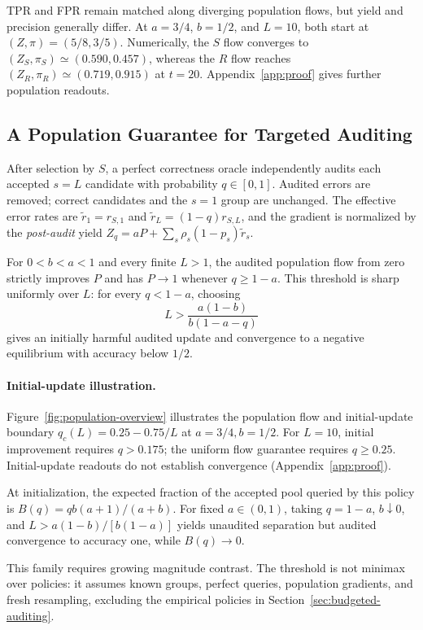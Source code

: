 \begin{remark}
TPR and FPR remain matched along diverging population flows, but yield and
precision generally differ. At $a=3/4$, $b=1/2$, and $L=10$, both start
at $(Z,\pi)=(5/8,3/5)$. Numerically, the $S$ flow converges to
$(Z_S,\pi_S)\simeq(0.590,0.457)$, whereas the $R$ flow reaches
$(Z_R,\pi_R)\simeq(0.719,0.915)$ at $t=20$.
Appendix~\ref{app:proof} gives further population readouts.
\end{remark}

\subsection{A Population Guarantee for Targeted Auditing}
\label{sec:audit-theory}

After selection by $S$, a perfect correctness oracle independently audits
each accepted $s=L$ candidate with probability $q\in[0,1]$. Audited errors
are removed; correct candidates and the $s=1$ group are unchanged.
The effective error rates are $\widetilde r_1=r_{S,1}$ and
$\widetilde r_L=(1-q)r_{S,L}$, and the gradient is normalized by the
\emph{post-audit} yield
$Z_q=aP+\sum_s\rho_s(1-p_s)\widetilde r_s$.

\begin{theorem}
\label{thm:audit}
For $0<b<a<1$ and every finite $L>1$, the audited population flow from zero
strictly improves $P$ and has $P\to1$ whenever $q\geq1-a$.
This threshold is sharp uniformly over $L$: for every $q<1-a$, choosing
\begin{equation}
 L>\frac{a(1-b)}{b(1-a-q)}
 \label{eq:audit-contrast}
\end{equation}
gives an initially harmful audited update and convergence to a negative
equilibrium with accuracy below $1/2$.
\end{theorem}


\paragraph{Initial-update illustration.}
Figure~\ref{fig:population-overview} illustrates the population flow and
initial-update boundary $q_c(L)=0.25-0.75/L$ at $a=3/4,b=1/2$.
For $L=10$, initial improvement requires $q>0.175$; the uniform flow
guarantee requires $q\geq0.25$. Initial-update readouts do not establish
convergence (Appendix~\ref{app:proof}).

\begin{corollary}
\label{cor:audit-budget}
At initialization, the expected fraction of the accepted pool queried by
this policy is $B(q)=qb(a+1)/(a+b)$. For fixed $a\in(0,1)$, taking
$q=1-a$, $b\downarrow0$, and
$L>a(1-b)/[b(1-a)]$ yields unaudited separation but audited convergence to
accuracy one, while $B(q)\to0$.
\end{corollary}
This family requires growing magnitude contrast. The threshold is not
minimax over policies: it assumes known groups, perfect queries, population
gradients, and fresh resampling, excluding the empirical policies in
Section~\ref{sec:budgeted-auditing}.

